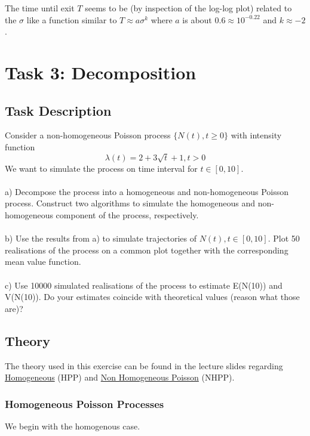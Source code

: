 The time until exit $T$ seems to be (by inspection of the log-log plot) related to the $\sigma$ like a function similar to $T \approx a \sigma^k$ where $a$ is about $0.6 \approx 10^{-0.22}$ and $k \approx -2$.
    
\newpage
\section{Task 3: Decomposition}
\label{sec:task3}

\subsection{Task Description}
Consider a non-homogeneous Poisson process $\{N(t), t \geq 0\}$ with intensity function
\begin{equation}
\lambda(t) = 2 + 3\sqrt{t} + 1 , t > 0
\end{equation}
\label{eq:task3Intensity}
We want to simulate the process on time interval for $t\in[0, 10]$.\\\\
a) Decompose the process into a homogeneous and non-homogeneous Poisson process. Construct two algorithms to simulate the homogeneous and non-homogeneous component of the process, respectively.\\\\
b) Use the results from a) to simulate trajectories of ${N(t), t \in[0, 10]}$. Plot 50 realisations of the process
on a common plot together with the corresponding mean value function.\\\\
c) Use 10000 simulated realisations of the process to estimate E(N(10)) and V(N(10)). Do your estimates coincide with theoretical values (reason what those are)?
\label{sec:desc3}

\subsection{Theory}
\label{sec:theory3} 
The theory used in this exercise can be found in the lecture slides regarding \href{https://www.canvas.umu.se/courses/6705/files/1700861?module_item_id=311131}{Homogeneous} (HPP) and \href{https://www.canvas.umu.se/courses/6705/files/1700861?module_item_id=311131}{Non Homogeneous Poisson} (NHPP).

\subsubsection{Homogeneous Poisson Processes}
We begin with the homogenous case.

